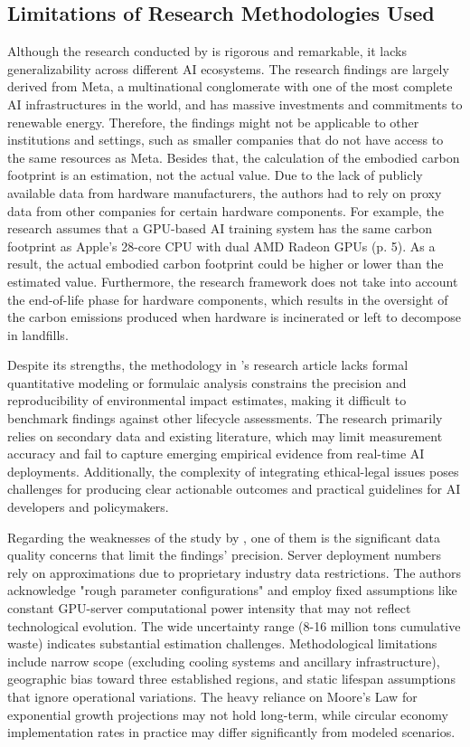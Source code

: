 \documentclass[a4paper, 12pt]{article}
\begin{document}
\subsection{Limitations of Research Methodologies Used}
Although the research conducted by \citet{Wu2022} is rigorous and remarkable, it lacks generalizability across different AI ecosystems. The research findings are largely derived from Meta, a multinational conglomerate with one of the most complete AI infrastructures in the world, and has massive investments and commitments to renewable energy. Therefore, the findings might not be applicable to other institutions and settings, such as smaller companies that do not have access to the same resources as Meta. Besides that, the calculation of the embodied carbon footprint is an estimation, not the actual value. Due to the lack of publicly available data from hardware manufacturers, the authors had to rely on proxy data from other companies for certain hardware components. For example, the research assumes that a GPU-based AI training system has the same carbon footprint as Apple's 28-core CPU with dual AMD Radeon GPUs (p. 5). As a result, the actual embodied carbon footprint could be higher or lower than the estimated value. Furthermore, the research framework does not take into account the end-of-life phase for hardware components, which results in the oversight of the carbon emissions produced when hardware is incinerated or left to decompose in landfills.\hfill \break

Despite its strengths, the methodology in \citet{Zhuk2023}'s research article lacks formal quantitative modeling or formulaic analysis constrains the precision and reproducibility of environmental impact estimates, making it difficult to benchmark findings against other lifecycle assessments. The research primarily relies on secondary data and existing literature, which may limit measurement accuracy and fail to capture emerging empirical evidence from real-time AI deployments. Additionally, the complexity of integrating ethical-legal issues poses challenges for producing clear actionable outcomes and practical guidelines for AI developers and policymakers.\hfill \break

Regarding the weaknesses of the study by \citet{wang_2024_ewaste}, one of them is the significant data quality concerns that limit the findings' precision. Server deployment numbers rely on approximations due to proprietary industry data restrictions. The authors acknowledge "rough parameter configurations" and employ fixed assumptions like constant GPU-server computational power intensity that may not reflect technological evolution. The wide uncertainty range (8-16 million tons cumulative waste) indicates substantial estimation challenges. Methodological limitations include narrow scope (excluding cooling systems and ancillary infrastructure), geographic bias toward three established regions, and static lifespan assumptions that ignore operational variations. The heavy reliance on Moore's Law for exponential growth projections may not hold long-term, while circular economy implementation rates in practice may differ significantly from modeled scenarios.\hfill \break
\end{document}
